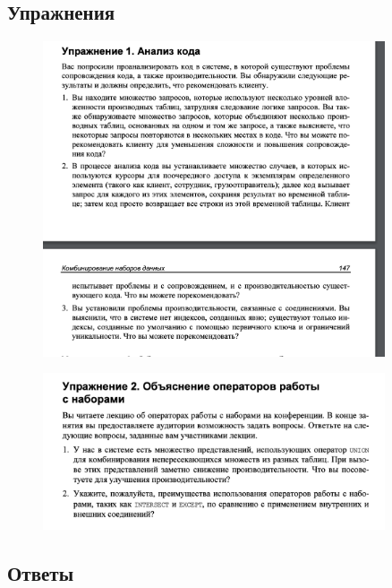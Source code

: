 \newpage
\subsection*{Упражнения}

\begin{figure}[h!]
	\begin{center}
		\includegraphics[width=0.9\textwidth]{img/ex11.png}
	\end{center}
	\captionsetup{justification=centering}
\end{figure}

\begin{figure}[h!]
	\begin{center}
		\includegraphics[width=0.9\textwidth]{img/ex12.png}
	\end{center}
	\captionsetup{justification=centering}
\end{figure}

\subsection*{Ответы}

